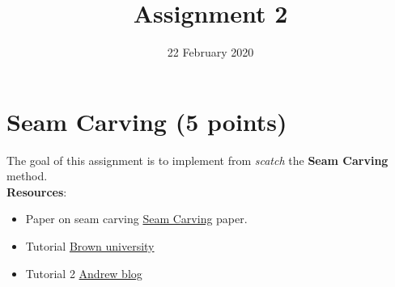 \documentclass[a4paper, nobib]{tufte-handout}
\title{Assignment 2}
\date{22 February 2020}
\begin{document}
\maketitle
\section{Seam Carving (5 points)}

The goal of this assignment is to implement from  \emph{scatch} the \textbf{Seam
Carving} method.\\[4pt]

\textbf{Resources}:\\
\begin{itemize}
  \item Paper on seam carving 
    \href{http://graphics.cs.cmu.edu/courses/15-463/2007_fall/hw/proj2/imret.pdf}{Seam
  Carving} paper.
\item Tutorial \href{http://cs.brown.edu/courses/cs129/results/proj3/taox}{Brown
  university}
\item Tutorial 2 \href{http://www.cs.cmu.edu/afs/andrew/scs/cs/15-463/f07/proj2/www/wwedler/}{Andrew
blog}
\end{itemize}
\end{document}
